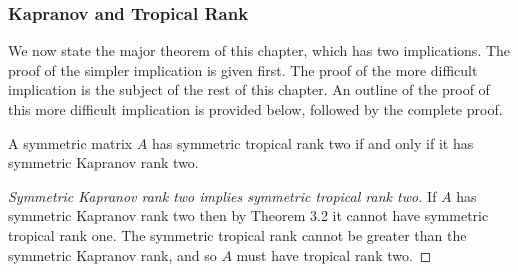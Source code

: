 \documentclass{article}
\begin{document}
\subsubsection{Kapranov and Tropical Rank}

We now state the major theorem of this chapter, which has two implications. The proof of the simpler implication is given first. The proof of the more difficult implication is the subject of the rest of this chapter. An outline of the proof of this more difficult implication is provided below, followed by the complete proof. 

\begin{thm}
  A symmetric matrix $A$ has symmetric tropical rank two if and only if it has symmetric Kapranov rank two.
\end{thm}

\begin{proof}[Symmetric Kapranov rank two implies symmetric tropical rank two]
  If $A$ has symmetric Kapranov rank two then by Theorem 3.2 it cannot have symmetric tropical rank one. The symmetric tropical rank cannot be greater than the symmetric Kapranov rank, and so $A$ must have tropical rank two.
\end{proof}
\end{document}
